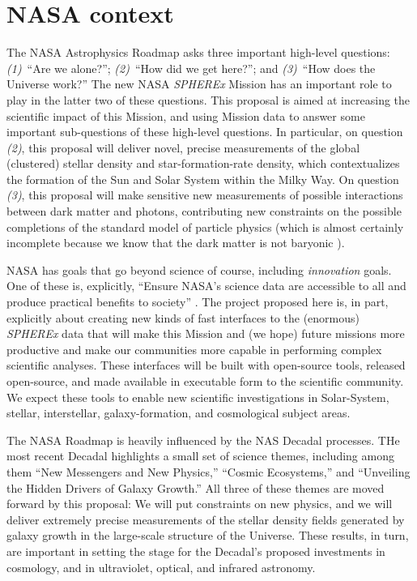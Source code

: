 \documentclass[12pt]{article}
\begin{document}
\section*{NASA context}
The NASA Astrophysics Roadmap asks three important high-level questions:
\textsl{(1)}~``Are we alone?'';
\textsl{(2)}~``How did we get here?''; and
\textsl{(3)}~``How does the Universe work?''
The new NASA \textsl{SPHEREx} Mission \cite{spherex} has an important role to play in the latter two of these questions.
This proposal is aimed at increasing the scientific impact of this Mission,
and using Mission data to answer some important sub-questions of these high-level questions.
In particular, on question \textsl{(2)}, this proposal will deliver novel, precise measurements of the global (clustered) stellar density and star-formation-rate density, which contextualizes the formation of the Sun and Solar System within the Milky Way.
On question \textsl{(3)}, this proposal will make sensitive new measurements of possible interactions between dark matter and photons, contributing new constraints on the possible completions of the standard model of particle physics (which is almost certainly incomplete because we know that the dark matter is not baryonic \cite{nonbaryonic}).

NASA has goals that go beyond science of course, including \emph{innovation} goals.
One of these is, explicitly, ``Ensure NASA’s science data are accessible to all and produce
practical benefits to society'' \cite{NASAscienceplan}.
The project proposed here is, in part, explicitly about creating new kinds of fast interfaces to the (enormous) \textsl{SPHEREx} data that will make this Mission and (we hope) future missions more productive and make our communities more capable in performing complex scientific analyses.
These interfaces will be built with open-source tools, released open-source, and made available in executable form to the scientific community.
We expect these tools to enable new scientific investigations in Solar-System, stellar, interstellar, galaxy-formation, and cosmological subject areas.

The NASA Roadmap is heavily influenced by the NAS Decadal processes.
THe most recent Decadal \cite{decadal} highlights a small set of science themes, including among them
``New Messengers and New Physics,''
``Cosmic Ecosystems,'' and
``Unveiling the Hidden Drivers of Galaxy Growth.''
All three of these themes are moved forward by this proposal:
We will put constraints on new physics, and we will deliver extremely precise measurements of the stellar density fields generated by galaxy growth in the large-scale structure of the Universe.
These results, in turn, are important in setting the stage for the Decadal's proposed investments in cosmology, and in ultraviolet, optical, and infrared astronomy.
\end{document}
